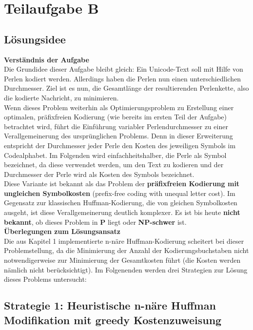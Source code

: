 \documentclass[a4paper,10pt,ngerman]{scrartcl}
\begin{document}
\section{Teilaufgabe B}
\subsection{Lösungsidee}
\textbf{Verständnis der Aufgabe}\\
\newline
Die Grundidee dieser Aufgabe bleibt gleich: Ein Unicode-Text soll mit Hilfe von Perlen kodiert werden. Allerdings haben die Perlen nun einen unterschiedlichen Durchmesser. Ziel ist es nun, die Gesamtlänge der resultierenden Perlenkette, also die kodierte Nachricht, zu minimieren.  \\
Wenn dieses Problem weiterhin als Optimierungsproblem zu Erstellung einer optimalen, präfixfreien Kodierung (wie bereits im ersten Teil der Aufgabe) betrachtet wird, führt die Einführung variabler Perlendurchmesser zu einer Verallgemeinerung des ursprünglichen Problems. Denn in dieser Erweiterung entspricht der Durchmesser jeder Perle den Kosten des jeweiligen Symbols im Codealphabet. Im Folgenden wird einfachheitshalber, die Perle als Symbol bezeichnet, da diese verwendet werden, um den Text zu kodieren und der Durchmesser der Perle wird als Kosten des Symbols bezeichnet. \\
\newline
Diese Variante ist bekannt als das Problem der \textbf{präfixfreien Kodierung mit ungleichen Symbolkosten} (prefix-free coding with unequal letter cost). Im Gegensatz zur klassischen Huffman-Kodierung, die von gleichen Symbolkosten ausgeht, ist diese Verallgemeinerung deutlich komplexer. Es ist bis heute \textbf{nicht bekannt}, ob dieses Problem in \textbf{P} liegt oder \textbf{NP-schwer} ist.  
\\\newline
\textbf{Überlegungen zum Lösungsansatz}\\
\newline
Die aus Kapitel 1 implementierte n-näre Huffman-Kodierung scheitert bei dieser Problemstellung, da die Minimierung der Anzahl der Kodierungsbuchstaben nicht notwendigerweise zur Minimierung der Gesamtkosten führt (die Kosten werden nämlich nicht berücksichtigt).  
\newline
Im Folgenenden werden drei Strategien zur Lösung dieses Problems untersucht: 

\subsection{Strategie 1: Heuristische n-näre Huffman Modifikation mit greedy Kostenzuweisung}
\end{document}
